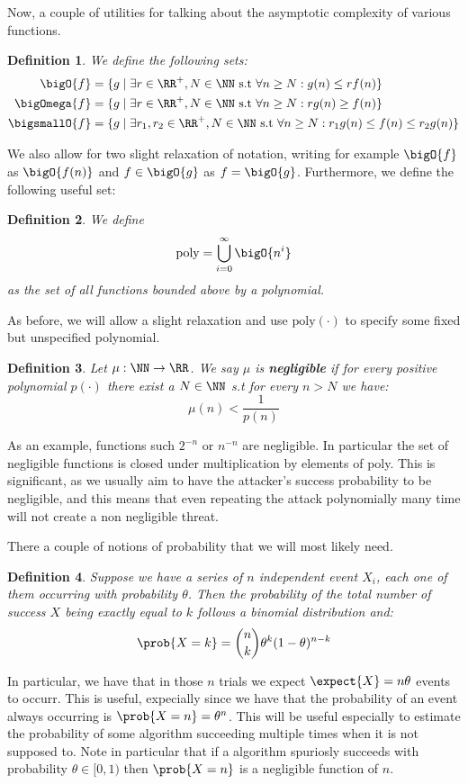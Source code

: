 \documentclass{article}
\newtheorem{definition}{Definition}
\begin{document}
Now, a couple of utilities for talking about the asymptotic complexity of various functions.

\begin{definition} We define the following sets:
\begin{align*}
    \bigO{f} &= \{ g \mid \exists r \in \RR^+, N \in \NN \text{ s.t } \forall n \geq N : g(n) \leq r f(n)  \} \\
    \bigOmega{f} &= \{ g \mid \exists r \in \RR^+, N \in \NN \text{ s.t } \forall n \geq N : r g(n) \geq f(n)  \} \\
    \bigsmallO{f} &= \{ g \mid \exists r_1,r_2 \in \RR^+, N \in \NN \text{ s.t } \forall n \geq N : r_1 g(n) \leq f(n) \leq r_2 g(n)  \}
\end{align*}
\end{definition}
We also allow for two slight relaxation of notation, writing for example $\bigO{f}$ as $\bigO{f(n)}$ and $f \in \bigO{g}$ as $f = \bigO{g}$. Furthermore, we define the following useful set:
\begin{definition} We define
\[\text{\normalfont{poly}} = \bigcup_{i = 0}^\infty \bigO{n^i}\]
as the set of all functions bounded above by a polynomial. 
\end{definition}
As before, we will allow a slight relaxation and use $\text{poly}(\cdot)$ to specify some fixed but unspecified polynomial.

\begin{definition}
Let $\mu : \NN \to \RR$. We say $\mu$ is \textbf{negligible} if for every positive polynomial $p(\cdot)$ there exist a $N \in \NN$ s.t for every $n > N$ we have:
\[\mu(n) < \frac{1}{p(n)}\]
\end{definition}
As an example, functions such $2^{-n}$ or $n^{-n}$ are negligible. In particular the set of negligible functions is closed under multiplication by elements of poly. This is significant, as we usually aim to have the attacker's success probability to be negligible, and this means that even repeating the attack polynomially many time will not create a non negligible threat. \par

There a couple of notions of probability that we will most likely need.

\begin{definition}
    Suppose we have a series of $n$ independent event $X_i$, each one of them 
    occurring with probability $\theta$. Then the probability of the total number of success $X$ being exactly equal to $k$ follows a binomial distribution and:
    \[ \prob{X = k} = \binom{n}{k} \theta^k (1 - \theta)^{n - k} \]
\end{definition}
In particular, we have that in those $n$ trials we expect $\expect{X} = n\theta$ events to occurr. This is useful, expecially since 
    we have that the probability of an event always occurring is $\prob{X = n} = \theta^n$. This will be useful especially 
    to  estimate the probability of some algorithm succeeding multiple times when it is not supposed to. 
    Note in particular that if a algorithm spuriosly succeeds with probability $\theta \in [0, 1)$ then $\prob{X = n}$ is a 
    negligible function of $n$. \par
\end{document}
